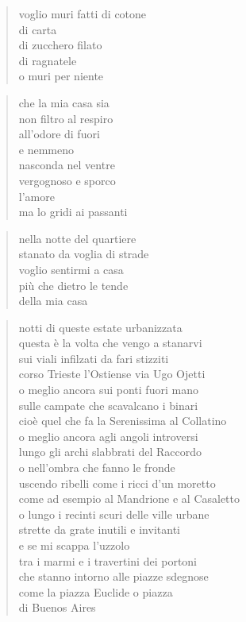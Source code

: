 \begin{verse}
    voglio muri fatti di cotone\\
    di carta\\
    di zucchero filato\\
    di ragnatele\\
    o muri per niente
\end{verse}

\begin{verse}
    che la mia casa sia\\
    non filtro al respiro\\
    all'odore di fuori\\
    e nemmeno\\
    nasconda nel ventre\\
    vergognoso e sporco\\
    l'amore\\
    ma lo gridi ai passanti
\end{verse}

\begin{verse}
    nella notte del quartiere\\
    stanato da voglia di strade\\
    voglio sentirmi a casa\\
    più che dietro le tende\\
    della mia casa
\end{verse}

\clearpage


\begin{verse}
    notti di queste estate urbanizzata\\
    questa è la volta che vengo a stanarvi\\
    sui viali infilzati da fari stizziti\\
    corso Trieste l'Ostiense via Ugo Ojetti\\
    o meglio ancora sui ponti fuori mano\\
    sulle campate che scavalcano i binari\\
    cioè quel che fa la Serenissima al Collatino\\
    o meglio ancora agli angoli introversi\\
    lungo gli archi slabbrati del Raccordo\\
    o nell'ombra che fanno le fronde\\
    uscendo ribelli come i ricci d'un moretto\\
    come ad esempio al Mandrione e al Casaletto\\
    o lungo i recinti scuri delle ville urbane\\
    strette da grate inutili e invitanti\\
    e se mi scappa l'uzzolo\\
    tra i marmi e i travertini dei portoni\\
    che stanno intorno alle piazze sdegnose\\
    come la piazza Euclide o piazza\\
    di Buenos Aires
\end{verse}

